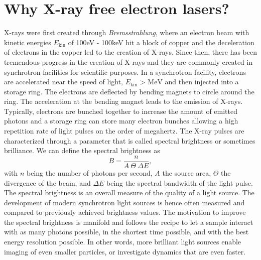 \section{Why X-ray free electron lasers?}\label{sec:xfel}
X-rays were first created through \textit{Bremsstrahlung}, where an electron beam with kinetic energies $E_{\text{kin}}$ of 100eV - 100keV hit a block of copper and the deceleration of electrons in the copper led to the creation of X-rays. Since then, there has been tremendous progress in the creation of X-rays and they are commonly created in synchrotron facilities for scientific purposes. In a synchrotron facility, electrons are accelerated near the speed of light, $E_{\text{kin}}\text{ > MeV}$ and then injected into a storage ring. The electrons are deflected by bending magnets to circle around the ring. The acceleration at the bending magnet leads to the emission of X-rays. Typically, electrons are bunched together to increase the amount of emitted photons and a storage ring can store many electron bunches allowing a high repetition rate of light pulses on the order of megahertz. The X-ray pulses are characterized through a parameter that is called spectral brightness \cite{Mills-2005-IUCR} or sometimes brilliance. We can define the spectral brightness as \cite{Als-Nielson-2011-JWS}
\begin{equation}
B = \frac{n}{A\ \Theta\ \Delta\! E},
\label{eq:spectral-brightness}
\end{equation}
with $n$ being the number of photons per second, $A$ the source area, $\Theta$ the divergence of the beam, and $\Delta\! E$ being the spectral bandwidth of the light pulse. The spectral brightness is an overall measure of the quality of a light source. The development of modern synchrotron light sources is hence often measured and compared to previously achieved brightness values. The motivation to improve the spectral brightness is manifold and follows the recipe to let a sample interact with as many photons possible, in the shortest time possible, and with the best energy resolution possible. In other words, more brilliant light sources enable imaging of even smaller particles, or investigate dynamics that are even faster.\\[1\baselineskip]
